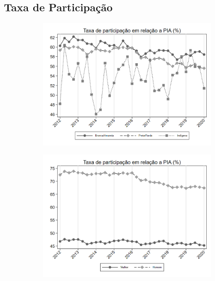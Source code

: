 \documentclass[11pt]{beamer}
\begin{document}
\subsection{Taxa de Participação}


\begin{frame}
\begin{figure}[h!tpb]
\centering
\begin{subfigure}{.5\textwidth}
  \centering
  \includegraphics[width=.95\linewidth]{../../analysis/output/composicao_demografica/raca/_composicao_demografica_raca_taxa_de_participacao.png}
  \label{fig:_composicao_demografica_raca_taxa_de_participacao}
\end{subfigure}%
\begin{subfigure}{.5\textwidth}
  \centering
  \includegraphics[width=.95\linewidth]{../../analysis/output/composicao_demografica/genero/_composicao_demografica_genero_taxa_de_participacao.png}
  \label{fig:_composicao_demografica_genero_taxa_de_participacao}
\end{subfigure}


\end{figure}
\end{frame}
\end{document}

